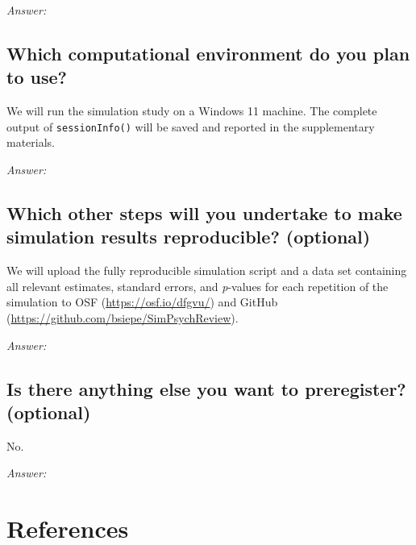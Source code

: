 \documentclass[12pt]{article}
\begin{document}
\textit{Answer:}

\subsection{Which computational environment do you plan to use?} 
    
    
\begin{examplebox}
We will run the simulation study on a Windows 11 machine. The complete output of \texttt{sessionInfo()} will be saved and reported in the supplementary materials.
\end{examplebox}

\textit{Answer:}

\subsection{Which other steps will you undertake to make simulation results reproducible? \textmd{(optional)}} 
    
    
\begin{examplebox}
We will upload the fully reproducible simulation script and a data set containing all relevant estimates, standard errors, and \textit{p}-values for each repetition of the simulation to OSF (\url{https://osf.io/dfgvu/}) and GitHub (\url{https://github.com/bsiepe/SimPsychReview}). 
\end{examplebox}

\textit{Answer:}

\subsection{Is there anything else you want to preregister? \textmd{(optional)}}
    
    
\begin{examplebox}
No.
\end{examplebox} 

\textit{Answer:}

\newpage
\section*{References}
\nocite{Siepe2024}
\printbibliography[heading=none]
\end{document}
